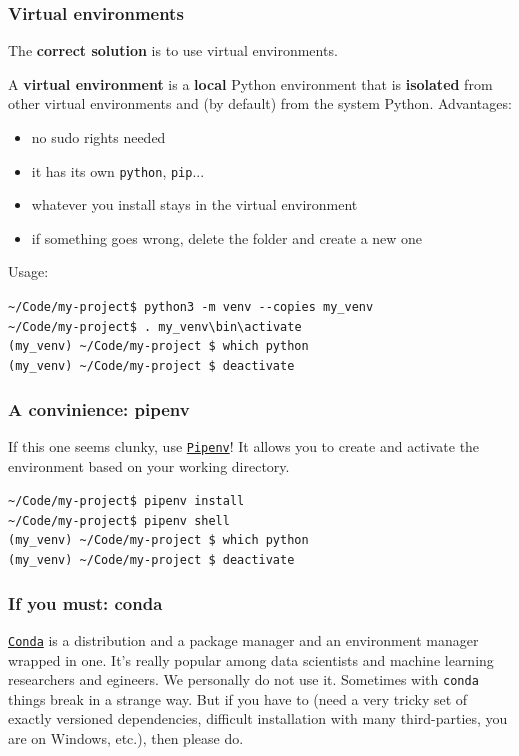 \documentclass[compress,english,aspectratio=1610]{beamer}
\let\olditem\item
\renewcommand{\item}{\setlength{\itemsep}{\fill}\olditem}
\begin{document}
\begin{frame}[fragile]
  \frametitle{Virtual environments}
  The \textbf{correct solution} is to use virtual environments.

  A \textbf{virtual environment} is a \textbf{local} Python environment that is \textbf{isolated}
  from other virtual environments and (by default) from the system Python.
  Advantages:
  \begin{itemize}
    \item no sudo rights needed
  	\item it has its own {\tt python}, {\tt pip}...
  	\item whatever you install stays in the virtual environment
  	\item if something goes wrong, delete the folder and create a new one
  \end{itemize}

  Usage:
  \begin{tcolorbox}[colback=mpg-gray,colframe=mpg-green,title=Commands]
	{\tt \textasciitilde/Code/my-project\$ python3 -m venv \texttt{-{}-}copies my\_venv}\\
	{\tt \textasciitilde/Code/my-project\$ . my\_venv\verb|\|bin\verb|\|activate}\\
	{\tt (my\_venv) \textasciitilde/Code/my-project \$ which python}\\
	{\tt (my\_venv) \textasciitilde/Code/my-project \$ deactivate}
  \end{tcolorbox}
\end{frame}

\begin{frame}[fragile]
  \frametitle{A convinience: pipenv}
  If this one seems clunky, use \href{https://github.com/pypa/pipenv}{\texttt{Pipenv}}! It allows you to create and activate the environment based on your working directory.
  \begin{tcolorbox}[colback=mpg-gray,colframe=mpg-green,title=Commands]
	{\tt \textasciitilde/Code/my-project\$ pipenv install}\\
	{\tt \textasciitilde/Code/my-project\$ pipenv shell}\\
	{\tt (my\_venv) \textasciitilde/Code/my-project \$ which python}\\
	{\tt (my\_venv) \textasciitilde/Code/my-project \$ deactivate}
  \end{tcolorbox}
\end{frame}

\begin{frame}
  \frametitle{If you must: conda}
  \href{https://docs.conda.io/en/latest/}{\texttt{Conda}} is a distribution and a package manager and an environment manager wrapped in one. It's really popular among data scientists and machine learning researchers and egineers.
  \vskip 1cm
  We personally do not use it. Sometimes with \texttt{conda} things break in a strange way. But if you have to (need a very tricky set of exactly versioned dependencies, difficult installation with many third-parties, you are on Windows, etc.), then please do.
\end{frame}
\end{document}
